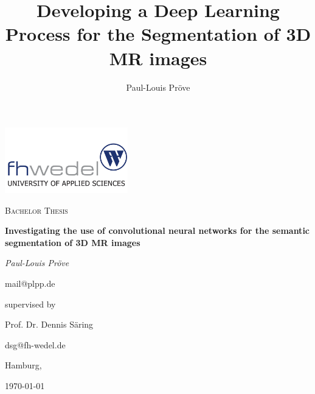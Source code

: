 \documentclass[11pt, a4paper]{article}
\title{Developing a Deep Learning Process for the Segmentation of 3D MR images}
\author{Paul-Louis Pröve}
\begin{document}
    \begin{titlepage}
    \centering
    \includegraphics[width=0.4\textwidth]{imgs/fhw.png}\par
    \vspace{1cm}
    {\scshape\Large Bachelor Thesis\par}
    \vspace{2cm}
    {\bfseries\Huge Investigating the use of convolutional neural networks for the semantic segmentation of 3D MR images\par}
    \vspace{2cm}
    {\itshape\Large Paul-Louis Pröve\par}
    mail@plpp.de\par
    \vfill
    supervised by\par
    Prof. Dr. Dennis Säring\par
    dsg@fh-wedel.de\par
    \vspace{1cm}
    Hamburg,\par \today\par
    \end{titlepage}

\tableofcontents
\newpage












\end{document}
